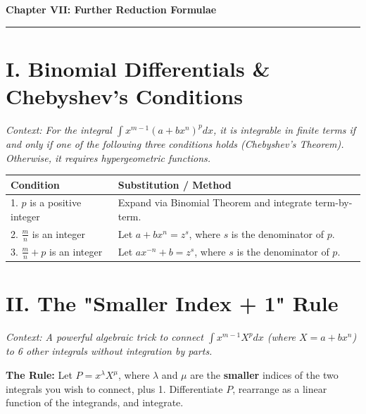 \documentclass[11pt, a4paper]{article}
\begin{document}
\newpage

\begin{center}
    {\LARGE \bfseries \color{accent} Chapter VII: Further Reduction Formulae}\\
    \vspace{0.2cm}
    {\color{accent}\rule{0.55\linewidth}{0.8pt}}
\end{center}
\vspace{0.35cm}


\section*{\color{primary} I. Binomial Differentials \& Chebyshev's Conditions}

\textit{\small Context: For the integral $\int x^{m-1}(a+bx^n)^p dx$, it is integrable in finite terms if and only if one of the following three conditions holds (Chebyshev's Theorem). Otherwise, it requires hypergeometric functions.}

\begin{center}
\begin{tabular}{@{}p{} p{}@{}}
\toprule
\textbf{Condition} & \textbf{Substitution / Method} \\
\midrule
1. $p$ is a positive integer & Expand via Binomial Theorem and integrate term-by-term. \\
2. $\frac{m}{n}$ is an integer & Let $a+bx^n = z^s$, where $s$ is the denominator of $p$. \\
3. $\frac{m}{n} + p$ is an integer & Let $ax^{-n} + b = z^s$, where $s$ is the denominator of $p$. \\
\bottomrule
\end{tabular}
\end{center}

\vspace{0.3cm}

\section*{\color{primary} II. The "Smaller Index + 1" Rule}

\textit{\small Context: A powerful algebraic trick to connect $\int x^{m-1}X^p dx$ (where $X=a+bx^n$) to 6 other integrals without integration by parts.}

\textbf{\color{accent}The Rule:} Let $P = x^\lambda X^\mu$, where $\lambda$ and $\mu$ are the \textbf{smaller} indices of the two integrals you wish to connect, plus 1. Differentiate $P$, rearrange as a linear function of the integrands, and integrate.
\end{document}
